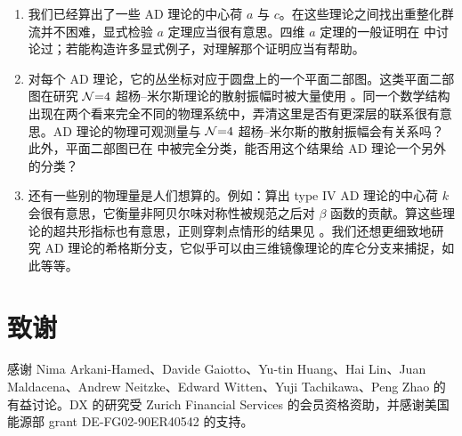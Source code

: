 \begin{enumerate}[label=\textup{\alph*.}]
  \item 我们已经算出了一些 AD 理论的中心荷 $a$ 与 $c$。在这些理论之间找出重整化群流并不困难，显式检验 $a$ 定理应当很有意思。四维 $a$ 定理的一般证明在 \cite{64} 中讨论过；若能构造许多显式例子，对理解那个证明应当有帮助。
  \item 对每个 AD 理论，它的丛坐标对应于圆盘上的一个平面二部图。这类平面二部图在研究 $\mathcal{N}{=}4$ 超杨–米尔斯理论的散射振幅时被大量使用 \cite{65}。同一个数学结构出现在两个看来完全不同的物理系统中，弄清这里是否有更深层的联系很有意思。AD 理论的物理可观测量与 $\mathcal{N}{=}4$ 超杨–米尔斯的散射振幅会有关系吗？此外，平面二部图已在 \cite{66} 中被完全分类，能否用这个结果给 AD 理论一个另外的分类？
  \item 还有一些别的物理量是人们想算的。例如：算出 type IV AD 理论的中心荷 $k$ 会很有意思，它衡量非阿贝尔味对称性被规范之后对 $\beta$ 函数的贡献。算这些理论的超共形指标也有意思，正则穿刺点情形的结果见 \cite{67}。我们还想更细致地研究 AD 理论的希格斯分支，它似乎可以由三维镜像理论的库仑分支来捕捉，如此等等。
\end{enumerate}


\section*{致谢}

感谢 Nima Arkani-Hamed、Davide Gaiotto、Yu-tin Huang、Hai Lin、Juan Maldacena、Andrew Neitzke、Edward Witten、Yuji Tachikawa、Peng Zhao 的有益讨论。DX 的研究受 Zurich Financial Services 的会员资格资助，并感谢美国能源部 grant DE-FG02-90ER40542 的支持。
